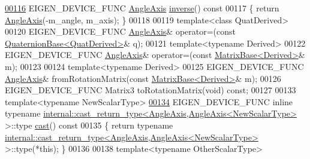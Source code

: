 \begin{DoxyCode}
\hyperlink{group___geometry___module_a915c92f43b1a6103762d0d0d059748fb}{00116}   EIGEN\_DEVICE\_FUNC \hyperlink{group___geometry___module_class_eigen_1_1_angle_axis}{AngleAxis} \hyperlink{group___geometry___module_a915c92f43b1a6103762d0d0d059748fb}{inverse}()\textcolor{keyword}{ const}
00117 \textcolor{keyword}{  }\{ \textcolor{keywordflow}{return} \hyperlink{group___geometry___module_class_eigen_1_1_angle_axis}{AngleAxis}(-m\_angle, m\_axis); \}
00118 
00119   \textcolor{keyword}{template}<\textcolor{keyword}{class} QuatDerived>
00120   EIGEN\_DEVICE\_FUNC \hyperlink{group___geometry___module_class_eigen_1_1_angle_axis}{AngleAxis}& operator=(\textcolor{keyword}{const} 
      \hyperlink{group___geometry___module_class_eigen_1_1_quaternion_base}{QuaternionBase<QuatDerived>}& q);
00121   \textcolor{keyword}{template}<\textcolor{keyword}{typename} Derived>
00122   EIGEN\_DEVICE\_FUNC \hyperlink{group___geometry___module_class_eigen_1_1_angle_axis}{AngleAxis}& operator=(\textcolor{keyword}{const} \hyperlink{group___core___module_class_eigen_1_1_matrix_base}{MatrixBase<Derived>}& m);
00123 
00124   \textcolor{keyword}{template}<\textcolor{keyword}{typename} Derived>
00125   EIGEN\_DEVICE\_FUNC \hyperlink{group___geometry___module_class_eigen_1_1_angle_axis}{AngleAxis}& fromRotationMatrix(\textcolor{keyword}{const} 
      \hyperlink{group___core___module_class_eigen_1_1_matrix_base}{MatrixBase<Derived>}& m);
00126   EIGEN\_DEVICE\_FUNC Matrix3 toRotationMatrix(\textcolor{keywordtype}{void}) \textcolor{keyword}{const};
00127 
00133   \textcolor{keyword}{template}<\textcolor{keyword}{typename} NewScalarType>
\hyperlink{group___geometry___module_a4baeb843025af6b4ce76e9a29cc08988}{00134}   EIGEN\_DEVICE\_FUNC \textcolor{keyword}{inline} \textcolor{keyword}{typename} 
      \hyperlink{struct_eigen_1_1internal_1_1cast__return__type}{internal::cast\_return\_type<AngleAxis,AngleAxis<NewScalarType>}
       >::type \hyperlink{group___geometry___module_a4baeb843025af6b4ce76e9a29cc08988}{cast}()\textcolor{keyword}{ const}
00135 \textcolor{keyword}{  }\{ \textcolor{keywordflow}{return} \textcolor{keyword}{typename} 
      \hyperlink{struct_eigen_1_1internal_1_1cast__return__type}{internal::cast\_return\_type<AngleAxis,AngleAxis<NewScalarType>}
       >::type(*\textcolor{keyword}{this}); \}
00136 
00138   \textcolor{keyword}{template}<\textcolor{keyword}{typename} OtherScalarType>

\end{DoxyCode}
